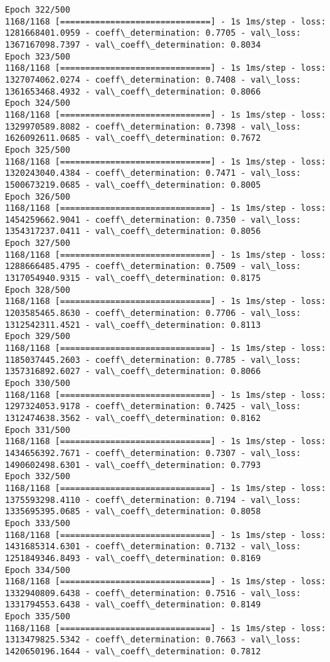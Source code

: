 \documentclass[11pt]{article}
\begin{document}
\begin{Verbatim}[commandchars=\\\{\}]
Epoch 322/500
1168/1168 [==============================] - 1s 1ms/step - loss: 1281668401.0959 - coeff\_determination: 0.7705 - val\_loss: 1367167098.7397 - val\_coeff\_determination: 0.8034
Epoch 323/500
1168/1168 [==============================] - 1s 1ms/step - loss: 1327074062.0274 - coeff\_determination: 0.7408 - val\_loss: 1361653468.4932 - val\_coeff\_determination: 0.8066
Epoch 324/500
1168/1168 [==============================] - 1s 1ms/step - loss: 1329970589.8082 - coeff\_determination: 0.7398 - val\_loss: 1626092611.0685 - val\_coeff\_determination: 0.7672
Epoch 325/500
1168/1168 [==============================] - 1s 1ms/step - loss: 1320243040.4384 - coeff\_determination: 0.7471 - val\_loss: 1500673219.0685 - val\_coeff\_determination: 0.8005
Epoch 326/500
1168/1168 [==============================] - 1s 1ms/step - loss: 1454259662.9041 - coeff\_determination: 0.7350 - val\_loss: 1354317237.0411 - val\_coeff\_determination: 0.8056
Epoch 327/500
1168/1168 [==============================] - 1s 1ms/step - loss: 1288666485.4795 - coeff\_determination: 0.7509 - val\_loss: 1317054940.9315 - val\_coeff\_determination: 0.8175
Epoch 328/500
1168/1168 [==============================] - 1s 1ms/step - loss: 1203585465.8630 - coeff\_determination: 0.7706 - val\_loss: 1312542311.4521 - val\_coeff\_determination: 0.8113
Epoch 329/500
1168/1168 [==============================] - 1s 1ms/step - loss: 1185037445.2603 - coeff\_determination: 0.7785 - val\_loss: 1357316892.6027 - val\_coeff\_determination: 0.8066
Epoch 330/500
1168/1168 [==============================] - 1s 1ms/step - loss: 1297324053.9178 - coeff\_determination: 0.7425 - val\_loss: 1312474638.3562 - val\_coeff\_determination: 0.8162
Epoch 331/500
1168/1168 [==============================] - 1s 1ms/step - loss: 1434656392.7671 - coeff\_determination: 0.7307 - val\_loss: 1490602498.6301 - val\_coeff\_determination: 0.7793
Epoch 332/500
1168/1168 [==============================] - 1s 1ms/step - loss: 1375593298.4110 - coeff\_determination: 0.7194 - val\_loss: 1335695395.0685 - val\_coeff\_determination: 0.8058
Epoch 333/500
1168/1168 [==============================] - 1s 1ms/step - loss: 1431685314.6301 - coeff\_determination: 0.7132 - val\_loss: 1251849346.8493 - val\_coeff\_determination: 0.8169
Epoch 334/500
1168/1168 [==============================] - 1s 1ms/step - loss: 1332940809.6438 - coeff\_determination: 0.7516 - val\_loss: 1331794553.6438 - val\_coeff\_determination: 0.8149
Epoch 335/500
1168/1168 [==============================] - 1s 1ms/step - loss: 1313479825.5342 - coeff\_determination: 0.7663 - val\_loss: 1420650196.1644 - val\_coeff\_determination: 0.7812

\end{Verbatim}
\end{document}
